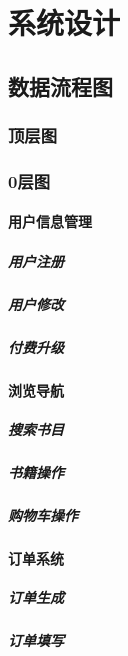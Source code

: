 \chapter{系统设计}
\section{数据流程图}
\subsection{顶层图}
\subsection{0层图}
\subsubsection{用户信息管理}
\paragraph{用户注册}
\paragraph{用户修改}
\paragraph{付费升级}
\subsubsection{浏览导航}
\paragraph{搜索书目}
\paragraph{书籍操作}
\paragraph{购物车操作}
\subsubsection{订单系统}
\paragraph{订单生成}
\paragraph{订单填写}
